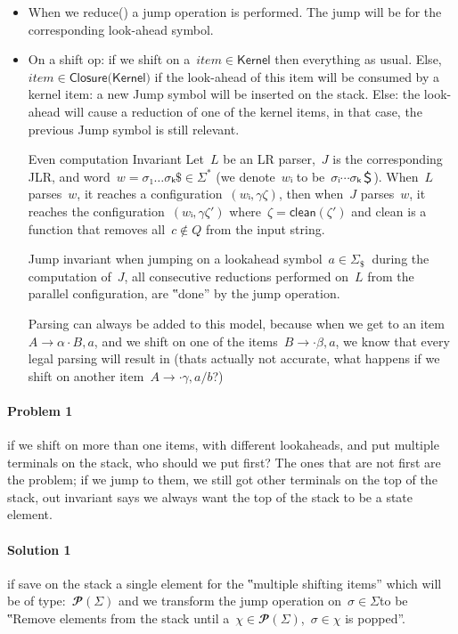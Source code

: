 \begin{itemize}
  \item When we \textsf{reduce()} a jump operation is performed.
        The jump will be for the corresponding look-ahead symbol.
  \item On a shift op:
        if we shift on a~$item∈\textsf{Kernel}$
        then everything as usual.
        Else,~$item∈\textsf{Closure(Kernel)}$
        if the look-ahead of this item will be consumed by a kernel item:
        a new Jump symbol will be inserted on the stack.
        Else:
        the look-ahead will cause a reduction of one of the kernel items,
        in that case, the previous Jump symbol is still relevant.
  \item[Even computation Invariant]
        Let~$L$ be an LR parser,~$J$ is the corresponding JLR, and word~$w=σ₁…σₖ\$∈Σ^*$ (we denote~$wᵢ$ to be~$σᵢ⋯σₖ ＄$).
        When~$L$ parses~$w$, it reaches a configuration~$(wᵢ,γζ)$,
        then when~$J$ parses~$w$, it reaches the configuration~$(wᵢ,γζ')$ where~$ζ= \textsf{clean}(ζ')$
        and \textsf{clean} is a function that removes all~$c∉Q$ from the input string.
  \item[Jump invariant]
        when jumping on a lookahead symbol~$a∈Σ_\$~$ during the computation of~$J$,
        all consecutive reductions performed on~$L$ from the parallel configuration, are ‟done” by the \textsf{jump} operation.
  \item[Parsing] can always be added to this model, because when we get to an item~$A→α·B,a$, and we shift on
        one of the items~$B→·β,a$, we know that every legal parsing will result in (thats actually not accurate, what happens
        if we shift on another item~$A→·γ,a/b$?)
\end{itemize}
\paragraph{Problem 1} if we shift on more than one items, with different lookaheads,
and put multiple terminals on the stack, who should we put first? The ones that are
not first are the problem; if we jump to them, we still got other terminals on the
top of the stack, out invariant says we always want the top of the stack to be a
state element.

\paragraph{Solution 1} if save on the stack a single element for the
‟multiple shifting items” which will be of type:~$𝓟(Σ)$
and we transform the jump operation on~$σ∈Σ$to be ‟Remove elements
from the stack until a~$χ∈𝓟(Σ)$,~$σ∈χ$ is popped”.

